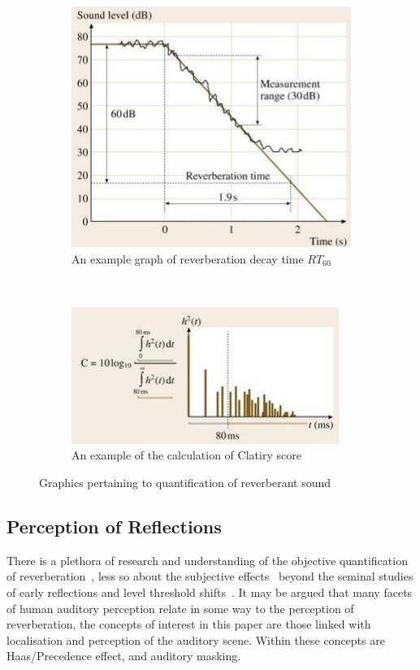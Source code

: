 \documentclass[paper=a4, fontsize=10pt, font=arial]{scrartcl} %
\numberwithin{equation}{section} %
\numberwithin{figure}{section} %
\numberwithin{table}{section} %
\begin{document}
\begin{figure}[H]
\centering
\begin{subfigure}[b]{0.4\textwidth}
\includegraphics[width=\textwidth]{revertimedefinition.jpg}
\centering
\caption{An example graph of reverberation decay time $RT_{60}$}
\end{subfigure}
~
\begin{subfigure}[b]{0.4\textwidth}
\includegraphics[width=\textwidth]{clarityscore.jpg}
\centering
\caption{An example of the calculation of Clatiry score}
\end{subfigure}
\caption{Graphics pertaining to quantification of reverberant sound ~\cite{rossing2007springer}}
\end{figure}

\subsection{Perception of Reflections}
There is a plethora of research and understanding of the objective quantification of reverberation~\cite{rossing2007springer}, less so about the subjective effects~\cite{Karjalainen2001} beyond the seminal studies of early reflections and level threshold shifts~\cite{Haas1972}. It may be argued that many facets of human auditory perception relate in some way to the perception of reverberation, the concepts of interest in this paper are those linked with localisation and perception of the auditory scene. Within these concepts are Haas/Precedence effect, and auditory masking.
\end{document}
